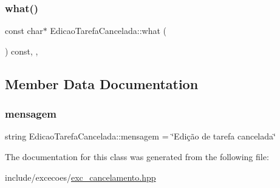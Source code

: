 \subsubsection{\texorpdfstring{what()}{what()}}
{\footnotesize\ttfamily const char$\ast$ Edicao\+Tarefa\+Cancelada\+::what (\begin{DoxyParamCaption}{ }\end{DoxyParamCaption}) const\hspace{0.3cm}{\ttfamily [inline]}, {\ttfamily [override]}, {\ttfamily [noexcept]}}



\subsection{Member Data Documentation}
\mbox{\label{classEdicaoTarefaCancelada_a9b2145786ee5d1969d5f7703f6e4fb60}} 
\subsubsection{\texorpdfstring{mensagem}{mensagem}}
{\footnotesize\ttfamily string Edicao\+Tarefa\+Cancelada\+::mensagem = \char`\"{}Edição de tarefa cancelada\char`\"{}\hspace{0.3cm}{\ttfamily [private]}}



The documentation for this class was generated from the following file\+:\begin{DoxyCompactItemize}
\item 
include/excecoes/\hyperlink{exc__cancelamento_8hpp}{exc\+\_\+cancelamento.\+hpp}\end{DoxyCompactItemize}
